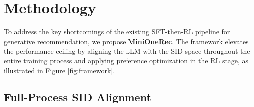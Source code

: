 \section{Methodology}
\label{method}



To address the key shortcomings of the existing SFT-then-RL pipeline for generative recommendation, we propose \textbf{MiniOneRec}.  
The framework elevates the performance ceiling by aligning the LLM with the SID space throughout the entire training process and applying preference optimization in the RL stage, as illustrated in Figure \ref{fig:framework}.

\subsection{Full-Process SID Alignment}

